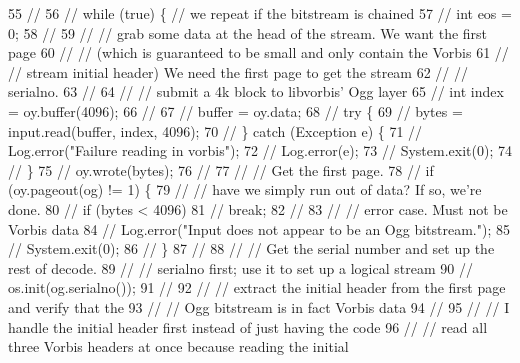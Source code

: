 \begin{DoxyCode}
55 \textcolor{comment}{//}
56 \textcolor{comment}{//      while (true) \{ // we repeat if the bitstream is chained}
57 \textcolor{comment}{//          int eos = 0;}
58 \textcolor{comment}{//}
59 \textcolor{comment}{//          // grab some data at the head of the stream.  We want the first page}
60 \textcolor{comment}{//          // (which is guaranteed to be small and only contain the Vorbis}
61 \textcolor{comment}{//          // stream initial header) We need the first page to get the stream}
62 \textcolor{comment}{//          // serialno.}
63 \textcolor{comment}{//}
64 \textcolor{comment}{//          // submit a 4k block to libvorbis' Ogg layer}
65 \textcolor{comment}{//          int index = oy.buffer(4096);}
66 \textcolor{comment}{//          }
67 \textcolor{comment}{//          buffer = oy.data;}
68 \textcolor{comment}{//          try \{}
69 \textcolor{comment}{//              bytes = input.read(buffer, index, 4096);}
70 \textcolor{comment}{//          \} catch (Exception e) \{}
71 \textcolor{comment}{//              Log.error("Failure reading in vorbis");}
72 \textcolor{comment}{//              Log.error(e);}
73 \textcolor{comment}{//              System.exit(0);}
74 \textcolor{comment}{//          \}}
75 \textcolor{comment}{//          oy.wrote(bytes);}
76 \textcolor{comment}{//}
77 \textcolor{comment}{//          // Get the first page.}
78 \textcolor{comment}{//          if (oy.pageout(og) != 1) \{}
79 \textcolor{comment}{//              // have we simply run out of data?  If so, we're done.}
80 \textcolor{comment}{//              if (bytes < 4096)}
81 \textcolor{comment}{//                  break;}
82 \textcolor{comment}{//}
83 \textcolor{comment}{//              // error case.  Must not be Vorbis data}
84 \textcolor{comment}{//              Log.error("Input does not appear to be an Ogg bitstream.");}
85 \textcolor{comment}{//              System.exit(0);}
86 \textcolor{comment}{//          \}}
87 \textcolor{comment}{//}
88 \textcolor{comment}{//          // Get the serial number and set up the rest of decode.}
89 \textcolor{comment}{//          // serialno first; use it to set up a logical stream}
90 \textcolor{comment}{//          os.init(og.serialno());}
91 \textcolor{comment}{//}
92 \textcolor{comment}{//          // extract the initial header from the first page and verify that the}
93 \textcolor{comment}{//          // Ogg bitstream is in fact Vorbis data}
94 \textcolor{comment}{//}
95 \textcolor{comment}{//          // I handle the initial header first instead of just having the code}
96 \textcolor{comment}{//          // read all three Vorbis headers at once because reading the initial}

\end{DoxyCode}
